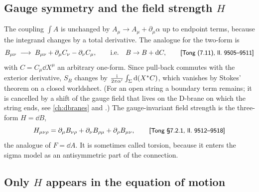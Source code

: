 \subsection{Gauge symmetry and the field strength \texorpdfstring{$H$}{H}}

The coupling $\int A$ is unchanged by $A_\mu\to A_\mu+\partial_\mu\alpha$ up to endpoint terms,
because the integrand changes by a total derivative. The analogue for the two-form
is
\begin{equation}\label{eq:backgrounds:gaugeB}
  B_{\mu\nu}\;\longrightarrow\;B_{\mu\nu}+\partial_\mu C_\nu-\partial_\nu C_\mu,
  \qquad\text{i.e.}\quad B\to B+\mathrm{d} C,
  \qquad\text{{\small\textsf{[Tong (7.11), ll.~9505--9511]}}}
\end{equation}
with $C=C_\mu\dd X^\mu$ an arbitrary one-form. Since pull-back commutes with the exterior
derivative, $S_B$ changes by $\frac{\mathrm{i}}{2\pi\alpha'}\int_\Sigma\mathrm{d}(X^*C)$, which vanishes by
Stokes' theorem on a closed worldsheet. (For an open string a boundary term remains; it is
cancelled by a shift of the gauge field that lives on the D-brane on which the string ends,
see \cref{ch:dbranes} and .) The gauge-invariant field
strength is the three-form $H=\dd B$,
\begin{equation}\label{eq:backgrounds:H}
  H_{\mu\nu\rho}=\partial_\mu B_{\nu\rho}+\partial_\nu B_{\rho\mu}+\partial_\rho B_{\mu\nu},
  \qquad\text{{\small\textsf{[Tong §7.2.1, ll.~9512--9518]}}}
\end{equation}
the analogue of $F=\dd A$. It is sometimes called torsion, because it enters the sigma model
as an antisymmetric part of the connection.

\subsection{Only \texorpdfstring{$H$}{H} appears in the equation of motion}

